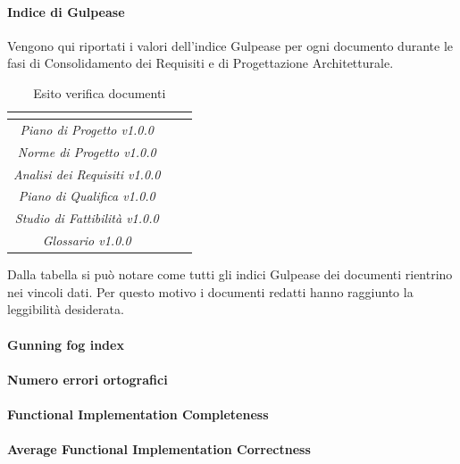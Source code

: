 \paragraph{Indice di Gulpease} \Spazio
Vengono qui riportati i valori dell'indice Gulpease per ogni documento durante le fasi di Consolidamento dei Requisiti e di Progettazione Architetturale.
\renewcommand{\arraystretch}{1.5}
\begin{table}[H]
	\begin{center}
		\begin{tabular}{|c|c|c|}
			\hline
			\rowcolor{title_row}
			\textbf{\color{title_text}{Documento}} & \textbf{\color{title_text}{Valore indice}} & \textbf{\color{title_text}{Esito}} \\
			\hline
			\emph{Piano di Progetto v1.0.0} & {} & {}\\
			\hline
			\emph{Norme di Progetto v1.0.0} & {} & {}\\
			\hline
			\emph{Analisi dei Requisiti v1.0.0} & {} & {}\\
			\hline
			\emph{Piano di Qualifica v1.0.0} & {} & {}\\
			\hline
			\emph{Studio di Fattibilità v1.0.0} & {} & {}\\
			\hline
			\emph{Glossario v1.0.0} & {} & {}\\
			\hline
		\end{tabular}
		\caption[Esiti verifica documenti, Analisi]{Esito verifica documenti}
		\label{tabella:verifica documenti}
	\end{center}
\end{table}
\renewcommand{\arraystretch}{1}

Dalla tabella si può notare come tutti gli indici Gulpease dei documenti rientrino nei vincoli dati. Per questo motivo i documenti redatti hanno raggiunto la leggibilità desiderata.

\paragraph{Gunning fog index} \Spazio
\paragraph{Numero errori ortografici} \Spazio
\paragraph{Functional Implementation Completeness} \Spazio
\paragraph{Average Functional Implementation Correctness} \Spazio
